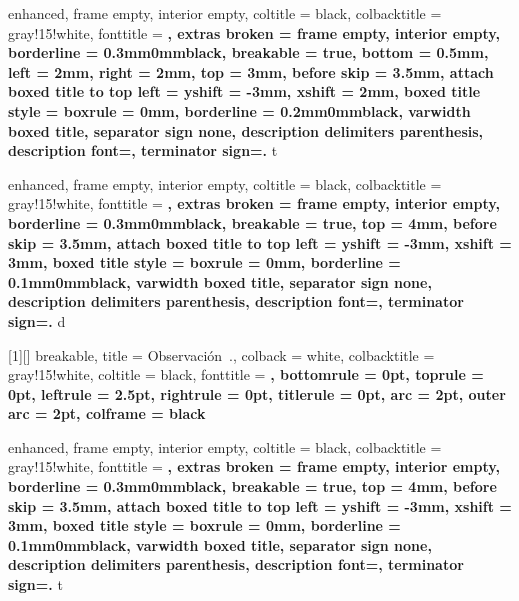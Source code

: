 \theoremstyle{definition}

\newtheorem{lemma}{Lema}[section]
\newtheorem{example}{Ejemplo}[section]
\newtheorem{theorem}{Teorema}[section]
\newtheorem{problem}{Problema}[section]
\newtheorem{property}{Propiedad}[section]
\newtheorem{exercise}{Ejercicio}[section]
\newtheorem{corollary}{Corolario}[section]
\newtheorem{definition}{Definición}[section]

\newtheorem*{note}{Nota}
\newtheorem*{hint}{Pista}


{
    enhanced,
    frame empty,
    interior empty,
    coltitle = black,
    colbacktitle = gray!15!white,
    fonttitle = \small\bfseries,
    extras broken = {frame empty, interior empty},
    borderline = {0.3mm}{0mm}{black},
    breakable = true,
    bottom = 0.5mm,         %
    left = 2mm,           %
    right = 2mm,          %
    top = 3mm,
    before skip = 3.5mm,
    attach boxed title to top left = {yshift = -3mm, xshift = 2mm},
    boxed title style = {boxrule = 0mm, borderline = {0.2mm}{0mm}{black}},
    varwidth boxed title,
    separator sign none, description delimiters parenthesis,
    description font=\bfseries,
    terminator sign={.\hspace{1mm}}
}
{t}



{
    enhanced,
    frame empty,
    interior empty,
    coltitle = black,
    colbacktitle = gray!15!white,
    fonttitle = \bfseries,
    extras broken = {frame empty, interior empty},
    borderline = {0.3mm}{0mm}{black},
    breakable = true,
    top = 4mm,
    before skip = 3.5mm,
    attach boxed title to top left = {yshift = -3mm, xshift = 3mm},
    boxed title style = {boxrule = 0mm, borderline = {0.1mm}{0mm}{black}},
    varwidth boxed title,
    separator sign none, description delimiters parenthesis,
    description font=\bfseries,
    terminator sign={.\hspace{1mm}}
}
{d}


[1][]
{
    breakable,
    title = Observación~\thetcbcounter.,
    colback = white,
    colbacktitle = gray!15!white,
    coltitle = black,
    fonttitle = \bfseries,
    bottomrule = 0pt,
    toprule = 0pt,
    leftrule = 2.5pt,
    rightrule = 0pt,
    titlerule = 0pt,
    arc = 2pt,
    outer arc = 2pt,
    colframe = black
}

{
    enhanced,
    frame empty,
    interior empty,
    coltitle = black,
    colbacktitle = gray!15!white,
    fonttitle = \bfseries,
    extras broken = {frame empty, interior empty},
    borderline = {0.3mm}{0mm}{black},
    breakable = true,
    top = 4mm,
    before skip = 3.5mm,
    attach boxed title to top left = {yshift = -3mm, xshift = 3mm},
    boxed title style = {boxrule = 0mm, borderline = {0.1mm}{0mm}{black}},
    varwidth boxed title,
    separator sign none, description delimiters parenthesis,
    description font=\bfseries,
    terminator sign={.\hspace{1mm}}
}
{t}